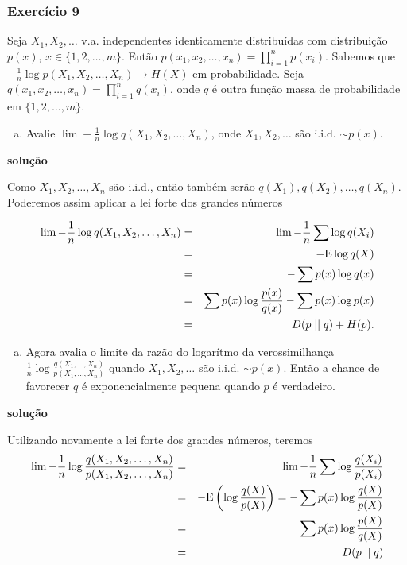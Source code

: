 \begin{frame}[allowframebreaks]
  \frametitle{Exercício 9}
  \begin{exercise}
  Seja $X_1, X_2, \ldots$ v.a. independentes identicamente distribuídas com distribuição $p(x)$, $x \in \{1,2,\ldots,m\}$.
  Então $p(x_1, x_2, \ldots, x_n) = \prod_{i=1}^{n} p(x_i)$. Sabemos que 
  $-\frac{1}{n} \log p(X_1, X_2, \ldots, X_n) \rightarrow H(X)$ em probabilidade.
  Seja $q(x_1, x_2, \ldots, x_n) = \prod_{i=1}^n q(x_i)$, onde $q$ é outra função massa de probabilidade em $\{1,2,\ldots,m\}$.

  \exercisebreak
  \begin{enumerate}[a)]
  \item Avalie $\lim - \frac{1}{n} \log q(X_1, X_2, \ldots, X_n)$, onde $X_1, X_2, \ldots$ são i.i.d. $\sim p(x)$.
  \end{enumerate}

  \textbf{solução}

  Como $X_1,X_2,\ldots,X_n$ são i.i.d., então também serão $q(X_1), q(X_2), \ldots, q(X_n)$. Poderemos
  assim aplicar a lei forte dos grandes números

  \exercisebreak
  \begin{eqnarray}
  \lim - \frac{1}{n} \log q(X_1, X_2, \ldots, X_n) &=& \lim - \frac{1}{n} \sum \log q(X_i) \nonumber \\
		&=& - \mathrm{E} \log q(X) \nonumber \\
		&=& - \sum p(x) \log q(x) \nonumber \\
		&=& \sum p(x) \log \frac{p(x)}{q(x)} - \sum p(x) \log p(x) \nonumber \\
		&=& D(p \mid\mid q) + H(p).
  \end{eqnarray}

  \exercisebreak
  \begin{enumerate}[b)]
  \item Agora avalia o limite da razão do logarítmo da verossimilhança 
	$\frac{1}{n} \log \frac{q(X_1, \ldots, X_n)}{p(X_1, \ldots, X_n)}$ quando
	$X_1,X_2,\ldots$ são i.i.d. $\sim p(x)$. Então a chance de favorecer $q$ é exponencialmente
	pequena quando $p$ é verdadeiro.
  \end{enumerate}

  \exercisebreak
  \textbf{solução}

  Utilizando novamente a lei forte dos grandes números, teremos
  \begin{eqnarray}
  \lim - \frac{1}{n} \log \frac{q(X_1, X_2, \ldots, X_n)}{p(X_1, X_2, \ldots, X_n)} &=& \lim - \frac{1}{n} \sum \log \frac{q(X_i)}{p(X_i)} \nonumber \\
	&=& - \mathrm{E} \left( \log \frac{q(X)}{p(X)} \right) = - \sum p(x) \log \frac{q(X)}{p(X)} \nonumber \\
	&=& \sum p(x) \log \frac{p(X)}{q(X)} \nonumber \\
	&=& D(p \mid \mid q)
  \end{eqnarray}

  \end{exercise}
\end{frame}


